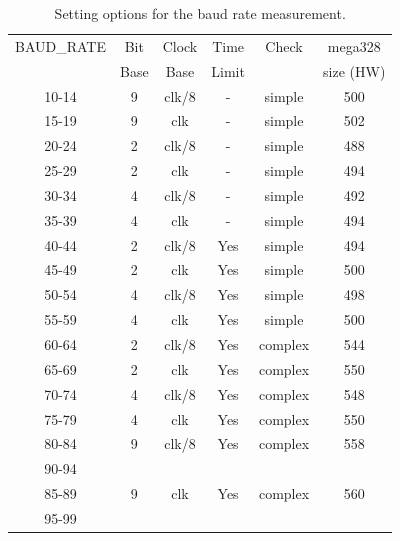 \begin{table}[H]
  \begin{center}
    \begin{tabular}{| c | c | c | c | c | c |}
    \hline
    BAUD\_RATE  & Bit   & Clock  & Time  & Check & mega328\\
		& Base  & Base   & Limit &       & size (HW) \\
    \hline
    \hline
	    10-14      &  9     & clk/8 &   -    & simple  & 500  \\
    \hline
	    15-19      &  9     &  clk  &   -    & simple  & 502  \\
    \hline
	    20-24      &  2     & clk/8 &   -    & simple  & 488  \\
    \hline
	    25-29      &  2     &  clk  &   -    & simple  & 494  \\
    \hline
	    30-34      &  4     & clk/8 &   -    & simple  & 492  \\
    \hline
	    35-39      &  4     &  clk  &   -    & simple  & 494  \\
    \hline
	    40-44      &  2     & clk/8 &   Yes  & simple  & 494  \\
    \hline
	    45-49      &  2     &  clk  &   Yes  & simple  & 500  \\
    \hline
	    50-54      &  4     & clk/8 &   Yes  & simple  & 498  \\
    \hline
	    55-59      &  4     &  clk  &   Yes  & simple  & 500  \\
    \hline
    \hline
	    60-64      &  2     &  clk/8 &  Yes  & complex & 544  \\
    \hline
	    65-69      &  2     &  clk   &  Yes  & complex & 550  \\
    \hline
	    70-74      &  4     &  clk/8 &  Yes  & complex & 548  \\
    \hline
	    75-79      &  4     &  clk   &  Yes  & complex & 550  \\
    \hline
	    80-84      &  9     &  clk/8 &  Yes  & complex & 558  \\
	    90-94      &        &        &       &         &      \\
    \hline
	    85-89      &  9     &  clk   &  Yes  & complex & 560  \\
	    95-99      &        &        &       &         &     \\

    \hline
    \end{tabular}
  \end{center}
  \caption{Setting options for the baud rate measurement.}
  \label{tab:AutoBaudControl}
\end{table}


